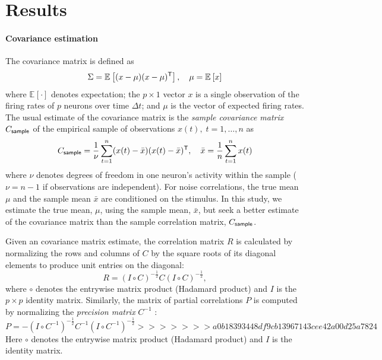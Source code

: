 \documentclass[10pt]{article}
\newcommand{\T}{{\sf T}}
\newcommand{\E}[2][]{\mathbb E_{#1}\left[ #2\right]}    %
\begin{document}
\section*{Results}
\paragraph{Covariance estimation}
The covariance matrix is defined as
\begin{equation}\label{eq:true-covariance}
    \Sigma = \E{(x-\mu)(x-\mu)^\T},\quad \mu = \E{x}
\end{equation}
where $\E{\cdot}$ denotes expectation; the $p\times 1$ vector $x$ is a single observation of the firing rates of $p$ neurons over time $\Delta t$; and $\mu$ is the vector of expected firing rates.  The usual estimate of the covariance matrix is the \emph{sample covariance matrix} $C_{\sf sample}$ of the empirical sample of observations $x(t),\; t=1,\ldots,n$ as
\begin{equation}\label{eq:sample}
    C_{\sf sample} = \frac 1 \nu \sum\limits_{t=1}^n (x(t)-\bar x)(x(t)-\bar x)^\T,\quad \bar x= \frac 1 n \sum\limits_{t=1}^n x(t)
\end{equation}
where $\nu$ denotes degrees of freedom in one neuron's activity within the sample ($\nu=n-1$ if observations are independent). For noise correlations, the true mean $\mu$ and the sample mean $\bar x$ are conditioned on the stimulus. In this study, we estimate the true mean, $\mu$, using the sample mean, $\bar x$, but seek a better estimate of the covariance matrix than the sample correlation matrix, $C_{\sf sample}$.  

Given an covariance matrix estimate, the correlation matrix $R$ is calculated by normalizing the rows and columns of $C$ by the square roots of its diagonal elements to produce unit entries on the diagonal:
\begin{equation}\label{eq:precision}
    R = \left(I\circ C\right)^{-\frac 1 2} C \left(I\circ C\right)^{-\frac 1 2},
\end{equation}
where $\circ$ denotes the entrywise matrix product (Hadamard product) and $I$ is the $p\times p$ identity matrix. 
Similarly, the matrix of partial correlations $P$ is computed by normalizing the \emph{precision matrix} $C^{-1}$ \cite{Whittaker:2009}:
\begin{equation}\label{eq:partial}
    P = -\left(I\circ C^{-1}\right)^{-\frac 1 2} C^{-1} \left(I\circ C^{-1}\right)^{-\frac 1 2}
>>>>>>> a0b18393448df9cb13967143cee42a00d25a7824
\end{equation}
Here $\circ$ denotes the entrywise matrix product (Hadamard product) and $I$ is the identity matrix.  
\end{document}
